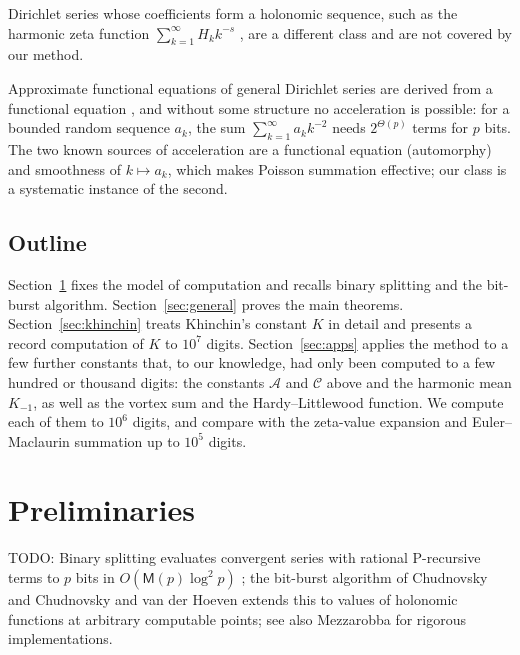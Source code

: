 \documentclass[11pt,reqno]{amsart}
\theoremstyle{definition}
\theoremstyle{remark}
\newcommand{\Mul}{\mathsf{M}}
\begin{document}
Dirichlet series whose coefficients form a holonomic sequence, such as the harmonic zeta function
$\sum_{k=1}^{\infty} H_kk^{-s}$ \cite{AV84,CC20}, are a different class
and are not covered by our method.



Approximate functional equations of general Dirichlet series are derived from
a functional equation \cite{Lav68,CN62}, and without some structure no acceleration is possible: for a bounded random
sequence $a_k$, the sum $\sum_{k=1}^{\infty}a_kk^{-2}$ needs $2^{\Theta(p)}$ terms for $p$ bits. The two known sources of
acceleration are a functional equation (automorphy) and smoothness of $k \mapsto a_k$, which makes Poisson summation
effective; our class is a systematic instance of the second.


\subsection{Outline}
Section~\ref{sec:prelim} fixes the model of computation and recalls binary splitting and the
bit-burst algorithm. Section~\ref{sec:general} proves the main theorems.
Section~\ref{sec:khinchin} treats
Khinchin's constant $K$ in detail and presents a record computation of $K$ to $10^7$ digits.
Section~\ref{sec:apps} applies the method to a few further constants that,
to our knowledge, had only been computed to a few hundred or thousand digits: the constants $\mathcal A$ and
$\mathcal C$ above and the harmonic mean $K_{-1}$, as well as the vortex sum and the Hardy--Littlewood function. We
compute each of them to $10^6$ digits, and compare with the zeta-value expansion and Euler--Maclaurin summation up to
$10^5$ digits.


\section{Preliminaries}\label{sec:prelim}

TODO: Binary splitting evaluates convergent series with rational P-recursive terms to $p$ bits in
$O(\Mul(p)\log^2 p)$ \cite{HP98,CHTZZ07}; the bit-burst algorithm of Chudnovsky and
Chudnovsky \cite{CC90} and van der Hoeven \cite{vdH99} extends this to values of holonomic
functions at arbitrary computable points; see also Mezzarobba \cite{Mez10,Mez16} for rigorous
implementations.
\end{document}
